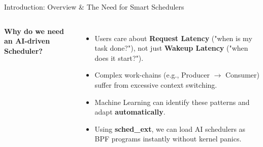\documentclass[aspectratio=169]{beamer}
\begin{document}
\begin{frame}{Introduction: Overview \& The Need for Smart Schedulers}
  \begin{columns}[T]
      \textbf{Why do we need an AI-driven Scheduler?}
      \vspace{4pt}
      \begin{itemize}\itemsep4pt\small
        \item Users care about \textbf{Request Latency} ("when is my task done?"), not just \textbf{Wakeup Latency} ("when does it start?").
        \item Complex work-chains (e.g., Producer $\to$ Consumer) suffer from excessive context switching.
        \item Machine Learning can identify these patterns and adapt \textbf{automatically}.
        \item Using \textbf{sched\_ext}, we can load AI schedulers as BPF programs instantly without kernel panics.
      \end{itemize}

    \end{columns}
\end{frame}
\end{document}
